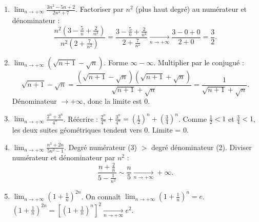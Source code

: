 \documentclass[11pt]{article}
\begin{document}
\begin{corrige}
\begin{enumerate}
    \item $\displaystyle \lim_{n\to +\infty} \frac{3n^2 - 5n + 2}{2n^2 + 7}$.
    Factoriser par $n^2$ (plus haut degré) au numérateur et dénominateur :
    \[ \frac{n^2(3 - \frac{5}{n} + \frac{2}{n^2})}{n^2(2 + \frac{7}{n^2})} = \frac{3 - \frac{5}{n} + \frac{2}{n^2}}{2 + \frac{7}{n^2}} \xrightarrow[n\to+\infty]{} \frac{3 - 0 + 0}{2 + 0} = \frac{3}{2}. \]
    \item $\displaystyle \lim_{n\to +\infty} \left( \sqrt{n+1} - \sqrt{n} \right)$.
    Forme $\infty - \infty$. Multiplier par le conjugué :
    \[ \sqrt{n+1} - \sqrt{n} = \frac{(\sqrt{n+1} - \sqrt{n})(\sqrt{n+1} + \sqrt{n})}{\sqrt{n+1} + \sqrt{n}} = \frac{1}{\sqrt{n+1} + \sqrt{n}}. \]
    Dénominateur $\to +\infty$, donc la limite est $0$.
    \item $\displaystyle \lim_{n\to +\infty} \frac{2^n + 3^n}{4^n}$.
    Réécrire : $\frac{2^n}{4^n} + \frac{3^n}{4^n} = \left(\frac{1}{2}\right)^n + \left(\frac{3}{4}\right)^n$.
    Comme $\frac{1}{2} < 1$ et $\frac{3}{4} < 1$, les deux suites géométriques tendent vers $0$. Limite = $0$.
    \item $\displaystyle \lim_{n\to +\infty} \frac{n^3 + 2n}{5n^2 - 1}$.
    Degré numérateur (3) $>$ degré dénominateur (2). Diviser numérateur et dénominateur par $n^2$ :
    \[ \frac{n + \frac{2}{n}}{5 - \frac{1}{n^2}} \sim \frac{n}{5} \xrightarrow[n\to+\infty]{} +\infty. \]
    \item $\displaystyle \lim_{n\to +\infty} \left(1 + \frac{1}{n}\right)^{2n}$.
    On connaît $\lim_{n\to+\infty} \left(1 + \frac{1}{n}\right)^n = e$.
    $\left(1 + \frac{1}{n}\right)^{2n} = \left[\left(1 + \frac{1}{n}\right)^n\right]^2 \xrightarrow[n\to+\infty]{} e^2$.
\end{enumerate}
\end{corrige}
\end{document}
